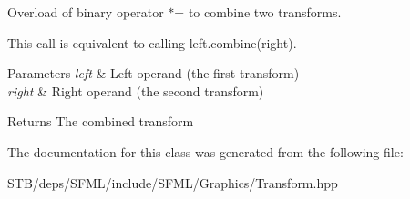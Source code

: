 Overload of binary operator $\ast$= to combine two transforms. 

This call is equivalent to calling left.\+combine(right).


\begin{DoxyParams}{Parameters}
{\em left} & Left operand (the first transform) \\
\hline
{\em right} & Right operand (the second transform)\\
\hline
\end{DoxyParams}
\begin{DoxyReturn}{Returns}
The combined transform 
\end{DoxyReturn}


The documentation for this class was generated from the following file\+:\begin{DoxyCompactItemize}
\item 
S\+T\+B/deps/\+S\+F\+M\+L/include/\+S\+F\+M\+L/\+Graphics/Transform.\+hpp\end{DoxyCompactItemize}
